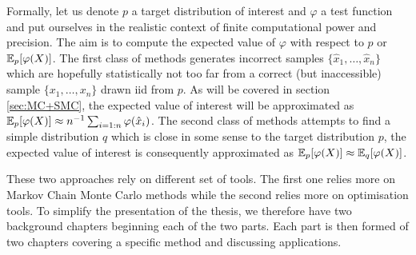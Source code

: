 Formally, let us denote $p$ a target distribution of interest and $\varphi$ a test function and put ourselves in the realistic context of finite computational power and precision. The aim is to compute the expected value of $\varphi$ with respect to $p$ or $\mathbb E_{p}[\varphi(X)]$. The first class of methods generates incorrect samples $\{\hat x_{1},\dots,\hat x_{n}\}$ which are hopefully statistically not too far from a correct (but inaccessible) sample $\{x_{1},\dots,x_{n}\}$ drawn iid from $p$. As will be covered in section \ref{sec:MC+SMC}, the expected value of interest will be approximated as $\mathbb E_{p}[\varphi(X)]\approx n^{-1} \sum_{i=1:n}\varphi(\hat x_{i})$. The second class of methods attempts to find a simple distribution $q$ which is close in some sense to the target distribution $p$, the expected value of interest is consequently approximated as $\mathbb E_{p}[\varphi(X)]\approx \mathbb E_{q}[\varphi(X)]$. 

These two approaches rely on different set of tools. The first one relies more on Markov Chain Monte Carlo methods while the second relies more on optimisation tools. To simplify the presentation of the thesis, we therefore have two background chapters beginning each of the two parts. Each part is then formed of two chapters covering a specific method and discussing applications.


%



